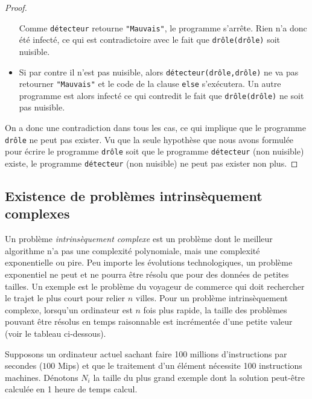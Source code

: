 \begin{proof}
\begin{itemize}
      Comme \lstinline|détecteur| retourne \lstinline|"Mauvais"|,
      le programme s'arrête.
      Rien n'a donc été infecté, ce qui est contradictoire avec le fait que \lstinline|drôle(drôle)| soit nuisible.
	\item Si par contre il n'est pas nuisible, alors \lstinline|détecteur(drôle,drôle)|
      ne va pas retourner \lstinline|"Mauvais"| et le code de la clause \lstinline|else| s'exécutera.
      Un autre programme est alors infecté ce qui contredit le fait que \lstinline|drôle(drôle)| ne soit pas nuisible.
\end{itemize}

On a donc une contradiction dans tous les cas, ce qui implique que le programme \lstinline|drôle| ne peut pas
exister. Vu que la seule hypothèse que nous avons formulée pour écrire le programme \lstinline|drôle| soit que le programme \lstinline|détecteur| (non nuisible) existe,
le programme \lstinline|détecteur| (non nuisible) ne peut pas exister non plus.
\end{proof}

\subsection{Existence de problèmes intrinsèquement complexes}
\label{subsec:existence_de_problemes_intrinsequement_complexes}

\begin{mydef}
	Un problème \emph{intrinsèquement complexe} est un problème dont le meilleur algorithme n'a pas une complexité polynomiale, mais une complexité exponentielle ou pire. Peu importe les évolutions technologiques, un problème exponentiel ne peut et ne pourra être résolu que pour des données de petites tailles.  Un exemple est le problème du voyageur de commerce qui doit rechercher le trajet le plus court pour relier $n$ villes. Pour un problème intrinsèquement complexe, lorsqu'un ordinateur est $n$ fois plus rapide, la taille des problèmes pouvant être résolus en temps raisonnable est incrémentée d'une petite valeur (voir le tableau ci-dessous).
\end{mydef}

Supposons un ordinateur actuel sachant faire 100 millions d'instructions par secondes ($100$ Mips) et que le traitement d'un élément nécessite 100 instructions machines. Dénotons $N_i$  la taille du \og plus grand\fg{} exemple dont la solution peut-être calculée en 1 heure de temps calcul.

